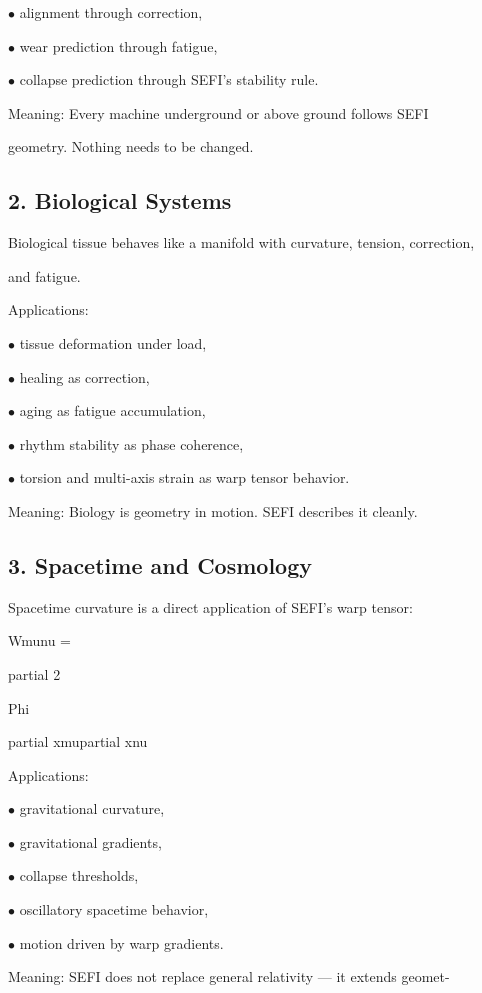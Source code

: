 \documentclass[10pt]{article}
\begin{document}
\noindent $\bullet$ alignment through correction,

\noindent $\bullet$ wear prediction through fatigue,

\noindent $\bullet$ collapse prediction through SEFI's stability rule.

Meaning: Every machine underground or above ground follows SEFI

geometry. Nothing needs to be changed.

\subsection*{2. Biological Systems}
Biological tissue behaves like a manifold with curvature, tension, correction,

and fatigue.

Applications:

\noindent $\bullet$ tissue deformation under load,

\noindent $\bullet$ healing as correction,


\noindent $\bullet$ aging as fatigue accumulation,

\noindent $\bullet$ rhythm stability as phase coherence,

\noindent $\bullet$ torsion and multi-axis strain as warp tensor behavior.

Meaning: Biology is geometry in motion. SEFI describes it cleanly.

\subsection*{3. Spacetime and Cosmology}
Spacetime curvature is a direct application of SEFI's warp tensor:

Wmunu =

partial 2

Phi

partial xmupartial xnu

Applications:

\noindent $\bullet$ gravitational curvature,

\noindent $\bullet$ gravitational gradients,

\noindent $\bullet$ collapse thresholds,

\noindent $\bullet$ oscillatory spacetime behavior,

\noindent $\bullet$ motion driven by warp gradients.

Meaning: SEFI does not replace general relativity --- it extends geomet-
\end{document}
